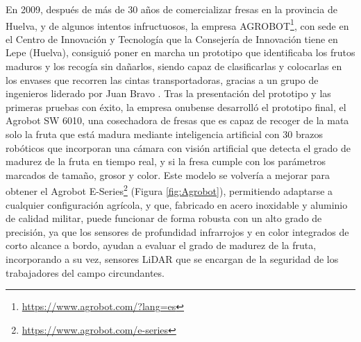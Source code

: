\pagebreak
En 2009, después de más de 30 años de comercializar fresas en la provincia de Huelva, y de algunos intentos infructuosos, la empresa AGROBOT\footnote{\url{https://www.agrobot.com/?lang=es}}, con sede en el Centro de Innovación y Tecnología que la Consejería de Innovación tiene en Lepe (Huelva), consiguió poner en marcha un prototipo %
que identificaba los frutos maduros y los recogía sin dañarlos, siendo capaz de clasificarlas y colocarlas en los envases que recorren las cintas transportadoras, gracias a un grupo de ingenieros liderado por Juan Bravo \cite{Cabanillas09}. Tras la presentación del prototipo y las primeras pruebas con éxito, la empresa onubense desarrolló el prototipo final, el Agrobot SW 6010, una cosechadora de fresas que es capaz de recoger de la mata solo la fruta que está madura mediante inteligencia artificial con 30 brazos robóticos que incorporan una cámara con visión artificial que detecta el grado de madurez de la fruta %
en tiempo real, y si la fresa cumple con los parámetros marcados de tamaño, grosor y color. %
Este modelo se volvería a mejorar para obtener el Agrobot E-Series\footnote{\url{https://www.agrobot.com/e-series}} (Figura \ref{fig:Agrobot}), %
permitiendo adaptarse a cualquier configuración agrícola, y que, fabricado en acero inoxidable y aluminio de calidad militar, puede funcionar de forma robusta con un alto grado de precisión, %
ya que los sensores de profundidad infrarrojos y en color integrados de corto alcance a bordo, %
ayudan a evaluar el grado de madurez de la fruta, incorporando a su vez, sensores LiDAR que se encargan de la seguridad de los trabajadores del campo circundantes.

